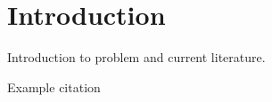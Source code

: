 \section{Introduction}

Introduction to problem and current literature.

Example citation \cite{tpe_2011}

